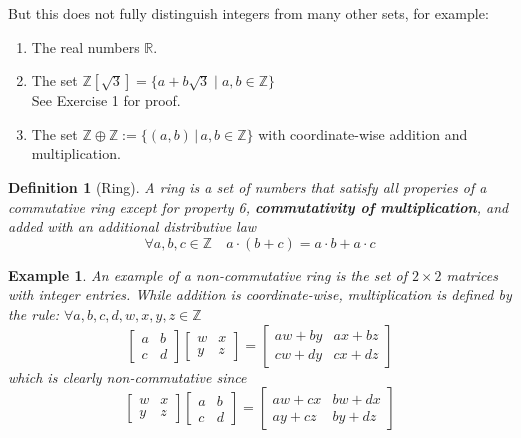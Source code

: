 \documentclass[11pt, oneside]{book}
\theoremstyle{break}
\newtheorem{defn}{Definition}[section]
\newtheorem{eg}{Example}[section]
\newcommand{\bb}[1]{\mathbb{#1}}			%
\begin{document}
But this does not fully distinguish integers from many other sets, for example:
\begin{enumerate}
	\item The real numbers $\bb{R}$.
	\item The set $\bb{Z}[\sqrt{3}] = \{a + b\sqrt{3} \; | \; a, b \in \bb{Z}\}$ \\
		See Exercise 1 for proof.
	\item The set $\bb{Z} \oplus \bb{Z} := \{(a, b) \, | \, a, b \in \bb{Z}\}$ with coordinate-wise addition and multiplication.
\end{enumerate}

\begin{defn}[Ring]
	A ring is a set of numbers that satisfy all properies of a commutative ring except for property 6, \textbf{commutativity of multiplication}, and added with an additional distributive law
	\begin{equation*}
		\forall a, b, c \in \bb{Z} \quad a \cdot (b + c) = a \cdot b + a \cdot c
	\end{equation*}
\end{defn}

\begin{eg}
	An example of a non-commutative ring is the set of $2 \times 2$ matrices with integer entries. While addition is coordinate-wise, multiplication is defined by the rule: $\forall a, b, c, d, w, x, y, z \in \bb{Z}$
	\begin{equation*}
		\begin{bmatrix}
			a & b \\
			c & d
		\end{bmatrix}
		\begin{bmatrix}
			w & x \\
			y & z
		\end{bmatrix}
		=
		\begin{bmatrix}
			aw + by & ax + bz \\
			cw + dy & cx + dz
		\end{bmatrix}
	\end{equation*}
	which is clearly non-commutative since
	\begin{equation*}
		\begin{bmatrix}
			w & x \\
			y & z
		\end{bmatrix}
		\begin{bmatrix}
			a & b \\
			c & d
		\end{bmatrix}
		=
		\begin{bmatrix}
			aw + cx & bw + dx \\
			ay + cz & by + dz
		\end{bmatrix}
	\end{equation*}
\end{eg}
\end{document}
